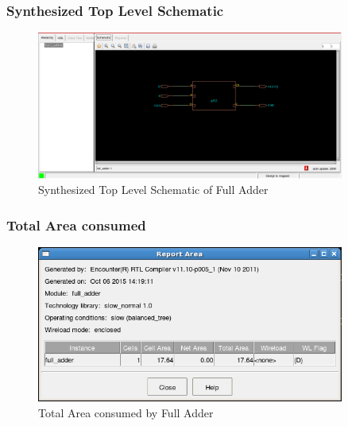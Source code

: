 \pagebreak

\subsubsection*{Synthesized Top Level Schematic}
\FloatBarrier
\begin{figure}[!hp]
\centering
\includegraphics[width=0.9\textwidth]{images/toplevel.png}
\caption{Synthesized Top Level Schematic of Full Adder}
\end{figure}

\subsubsection*{Total Area consumed}
\FloatBarrier
\begin{figure}[!hp]
\centering
\includegraphics[width=0.9\textwidth]{images/area.png}
\caption{Total Area consumed by Full Adder}
\end{figure}
\pagebreak

